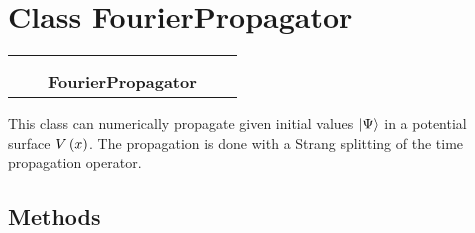 
\section{Class FourierPropagator}

    \label{FourierPropagator:FourierPropagator}
\begin{tabular}{cccccc}
\multicolumn{2}{r}{\settowidth{\BCL}{Propagator}\multirow{2}{\BCL}{Propagator}}
&&
  \\\cline{3-3}
  &&\multicolumn{1}{c|}{}
&&
  \\
&&\multicolumn{2}{l}{\textbf{FourierPropagator}}
\end{tabular}

This class can numerically propagate given initial values
$\Ket{\Psi}$ in a potential surface
$V\left( x \right)$. The propagation is done with a Strang
splitting of the time propagation operator.



  \subsection{Methods}

    \vspace{0.5ex}

